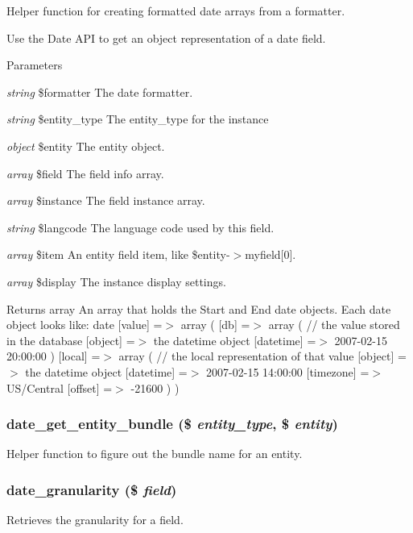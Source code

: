 \label{date_8module_a4b019297d5d8f388aa2252ad62b3bfde}
Helper function for creating formatted date arrays from a formatter.

Use the Date API to get an object representation of a date field.


\begin{DoxyParams}{Parameters}
\item[{\em string}]\$formatter The date formatter. \item[{\em string}]\$entity\_\-type The entity\_\-type for the instance \item[{\em object}]\$entity The entity object. \item[{\em array}]\$field The field info array. \item[{\em array}]\$instance The field instance array. \item[{\em string}]\$langcode The language code used by this field. \item[{\em array}]\$item An entity field item, like \$entity-\/$>$myfield\mbox{[}0\mbox{]}. \item[{\em array}]\$display The instance display settings.\end{DoxyParams}
\begin{DoxyReturn}{Returns}
array An array that holds the Start and End date objects. Each date object looks like: date \mbox{[}value\mbox{]} =$>$ array ( \mbox{[}db\mbox{]} =$>$ array ( // the value stored in the database \mbox{[}object\mbox{]} =$>$ the datetime object \mbox{[}datetime\mbox{]} =$>$ 2007-\/02-\/15 20:00:00 ) \mbox{[}local\mbox{]} =$>$ array ( // the local representation of that value \mbox{[}object\mbox{]} =$>$ the datetime object \mbox{[}datetime\mbox{]} =$>$ 2007-\/02-\/15 14:00:00 \mbox{[}timezone\mbox{]} =$>$ US/Central \mbox{[}offset\mbox{]} =$>$ -\/21600 ) ) 
\end{DoxyReturn}
\hypertarget{date_8module_a6ae854a04f35eae5dc91b242802728d0}{
\subsubsection[{date\_\-get\_\-entity\_\-bundle}]{\setlength{\rightskip}{0pt plus 5cm}date\_\-get\_\-entity\_\-bundle (\$ {\em entity\_\-type}, \/  \$ {\em entity})}}
\label{date_8module_a6ae854a04f35eae5dc91b242802728d0}
Helper function to figure out the bundle name for an entity. \hypertarget{date_8module_a524c8837d65b4e1b512a7ea3ae33d016}{
\subsubsection[{date\_\-granularity}]{\setlength{\rightskip}{0pt plus 5cm}date\_\-granularity (\$ {\em field})}}
\label{date_8module_a524c8837d65b4e1b512a7ea3ae33d016}
Retrieves the granularity for a field.

